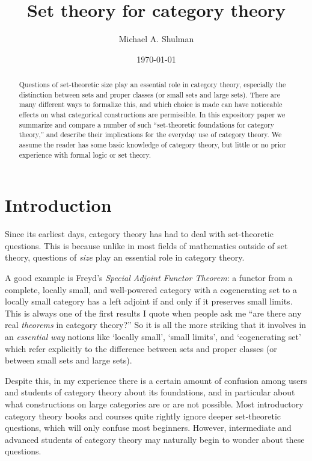 \documentclass{amsart}
\title{Set theory for category theory}
\author{Michael A. Shulman}
\date{\today}
\begin{document}
\maketitle

\begin{abstract}
  Questions of set-theoretic size play an essential role in category
  theory, especially the distinction between sets and proper classes
  (or small sets and large sets).  There are many different ways to
  formalize this, and which choice is made can have noticeable effects
  on what categorical constructions are permissible.  In this
  expository paper we summarize and compare a number of such
  ``set-theoretic foundations for category theory,'' and describe their
  implications for the everyday use of category theory.  We assume the
  reader has some basic knowledge of category theory, but little or no
  prior experience with formal logic or set theory.
\end{abstract}

\section{Introduction}
\label{sec:introduction}

Since its earliest days, category theory has had to deal with
set-theoretic questions.  This is because unlike in most fields of
mathematics outside of set theory, questions of \emph{size} play an
essential role in category theory.

A good example is Freyd's \emph{Special Adjoint Functor Theorem}: a
functor from a complete, locally small, and well-powered category with
a cogenerating set to a locally small category has a left adjoint if
and only if it preserves small limits.  This is always one of the
first results I quote when people ask me ``are there any real
\emph{theorems} in category theory?''  So it is all the more striking
that it involves in an \emph{essential way} notions like `locally
small', `small limits', and `cogenerating set' which refer explicitly
to the difference between sets and proper classes (or between small
sets and large sets).

Despite this, in my experience there is a certain amount of confusion
among users and students of category theory about its foundations, and
in particular about what constructions on large categories are or are
not possible.  Most introductory category theory books and courses
quite rightly ignore deeper set-theoretic questions, which will only
confuse most beginners.  However, intermediate and advanced students
of category theory may naturally begin to wonder about these
questions.
\end{document}
